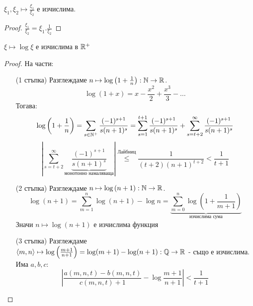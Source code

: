 \begin{corollary}
    $\xi_1, \xi_2 \mapsto \frac{\xi_1}{\xi_2}$ е изчислима.
\end{corollary}
\begin{proof}
    $\frac{\xi_1}{\xi_2} = \xi_1. \frac{1}{\xi_2}$
\end{proof}

\begin{theorem}[Логаритъм]
    $\xi \mapsto \log \xi$ е изчислима в ${\mathbb{R}}^+$
\end{theorem}
\begin{proof}
    На части:

    \begin{itemize}
        \item[(1 стъпка)] Разглеждаме $n \mapsto \log\left(1 + \frac{1}{n}\right) : {\mathbb{N}} \to {\mathbb{R}}$.
              \begin{equation}
                  \log (1+x) = x - \frac{x^2}{2} + \frac{x^3}{3} - \dots
              \end{equation}
              Тогава:
              \begin{equation}
                  \log \left(1 + \frac{1}{n}\right) = \sum_{s \in {\mathbb{N}}^+} \frac{(-1)^{s+1}}{s(n+1)^s} = \sum_{s=1}^{t+1} \frac{(-1)^{s+1}}{s(n+1)^s} + \sum_{s = t+2}^\infty \frac{(-1)^{s+1}}{s(n+1)^s}
              \end{equation}
              \begin{equation}
                  \left|\sum_{s = t+2}^\infty \underbrace{\frac{(-1)^{s+1}}{s(n+1)^s}}_{\text{монотонно намаляваща}} \right| \overset{\text{Лайбниц}}{\leq} \frac{1}{(t+2)(n+1)^{t+2}} < \frac{1}{t+1}
              \end{equation}
        \item[(2 стъпка)] Разглеждаме $n \mapsto \log\left(n+1\right) : {\mathbb{N}} \to {\mathbb{R}}$.
              \begin{equation}
                  \log (n+1) = \sum_{m=1}^n \log(n+1) - \log n = \underbrace{\sum_{m=0}^n \log \left( 1 + \frac{1}{m+1}\right)}_{\text{изчислима сума}}
              \end{equation}
              Значи $n \mapsto \log\left(n+1\right)$ е изчислима функция
        \item[(3 стъпка)] Разглеждаме $\langle m, n \rangle \mapsto \log\left(\frac{m+1}{n+1}\right) = \log(m+1) - \log(n+1) : {\mathbb{Q}} \to {\mathbb{R}}$ - също е изчислима. Има $a, b, c$:
        \begin{equation}
            \left|\frac{a(m,n,t) - b(m,n,t)}{c(m,n,t) + 1} - \log \frac{m+1}{n+1}\right| < \frac{1}{t+1}

\end{equation}
\end{itemize}
\end{proof}
